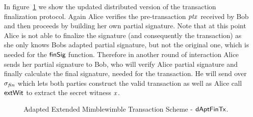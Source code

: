 In figure~\ref{fig:inst-apt-mw-tx-fin} we show the updated distributed version of the transaction finalization protocol. Again Alice verifies the pre-transaction $\mathit{ptx}$ received by Bob and then proceeds by building
her own partial signature. Note that at this point Alice is not able to finalize the signature (and consequently the transaction) as she only knows Bobs adapted partial signature, but not the original one, which is needed
for the $\mathsf{finSig}$ function. Therefore in another round of interaction Alice sends her partial signature to Bob, who will verify Alice partial signature and finally calculate the final signature, needed for the transaction.
He will send over $\sigma_{\mathit{fin}}$ which lets both parties construct the valid transaction as well as Alice call $\mathsf{extWit}$ to extract the secret witness $\mathit{x}$.

\begin{figure}
    \begin{sideways}
    \end{sideways}
    \caption{Adapted Extended Mimblewimble Transaction Scheme - $\mathsf{dAptFinTx}$. \label{fig:inst-apt-mw-tx-fin}}
\end{figure}

